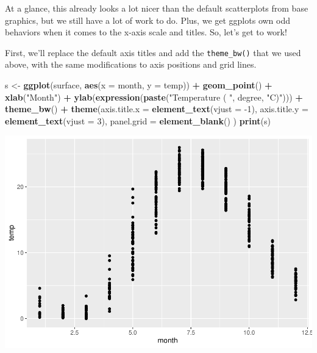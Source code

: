 \documentclass[
]{book}
\newenvironment{Shaded}{\begin{snugshade}}{\end{snugshade}}
\newcommand{\DataTypeTok}[1]{\textcolor[rgb]{0.13,0.29,0.53}{#1}}
\newcommand{\DecValTok}[1]{\textcolor[rgb]{0.00,0.00,0.81}{#1}}
\newcommand{\KeywordTok}[1]{\textcolor[rgb]{0.13,0.29,0.53}{\textbf{#1}}}
\newcommand{\NormalTok}[1]{#1}
\newcommand{\OperatorTok}[1]{\textcolor[rgb]{0.81,0.36,0.00}{\textbf{#1}}}
\newcommand{\StringTok}[1]{\textcolor[rgb]{0.31,0.60,0.02}{#1}}
\begin{document}
At a glance, this already looks a lot nicer than the default scatterplots from base graphics, but we still have a lot of work to do. Plus, we get ggplots own odd behaviors when it comes to the x-axis scale and titles. So, let's get to work!

First, we'll replace the default axis titles and add the \texttt{theme\_bw()} that we used above, with the same modifications to axis positions and grid lines.

\begin{Shaded}
\begin{Highlighting}[]
\NormalTok{s <-}\StringTok{ }\KeywordTok{ggplot}\NormalTok{(surface, }\KeywordTok{aes}\NormalTok{(}\DataTypeTok{x =}\NormalTok{ month, }\DataTypeTok{y =}\NormalTok{ temp)) }\OperatorTok{+}
\StringTok{  }\KeywordTok{geom_point}\NormalTok{() }\OperatorTok{+}\StringTok{ }
\StringTok{  }\KeywordTok{xlab}\NormalTok{(}\StringTok{"Month"}\NormalTok{) }\OperatorTok{+}
\StringTok{  }\KeywordTok{ylab}\NormalTok{(}\KeywordTok{expression}\NormalTok{(}\KeywordTok{paste}\NormalTok{(}\StringTok{"Temperature ( "}\NormalTok{, degree, }\StringTok{"C)"}\NormalTok{))) }\OperatorTok{+}
\StringTok{  }\KeywordTok{theme_bw}\NormalTok{() }\OperatorTok{+}
\StringTok{  }\KeywordTok{theme}\NormalTok{(}\DataTypeTok{axis.title.x =} \KeywordTok{element_text}\NormalTok{(}\DataTypeTok{vjust =} \DecValTok{-1}\NormalTok{),}
        \DataTypeTok{axis.title.y =} \KeywordTok{element_text}\NormalTok{(}\DataTypeTok{vjust =} \DecValTok{3}\NormalTok{),}
        \DataTypeTok{panel.grid =} \KeywordTok{element_blank}\NormalTok{()}
\NormalTok{  )}
\KeywordTok{print}\NormalTok{(s)}
\end{Highlighting}
\end{Shaded}

\includegraphics{worstr_files/figure-latex/unnamed-chunk-104-1.pdf}
\end{document}
